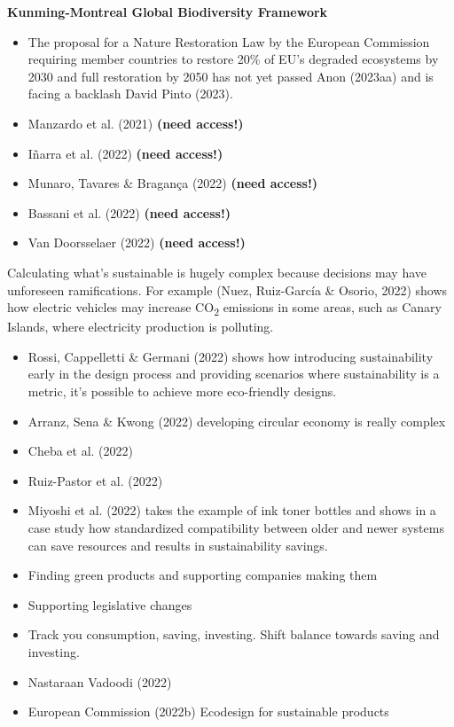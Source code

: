 \documentclass[
  letterpaper,
  DIV=11,
  numbers=noendperiod]{scrartcl}
\begin{document}
\textbf{Kunming-Montreal Global Biodiversity Framework}

\begin{itemize}
\item
  The proposal for a Nature Restoration Law by the European Commission
  requiring member countries to restore 20\% of EU's degraded ecosystems
  by 2030 and full restoration by 2050 has not yet passed Anon (2023aa)
  and is facing a backlash David Pinto (2023).
\item
  Manzardo et al. (2021) \textbf{(need access!)}
\item
  Iñarra et al. (2022) \textbf{(need access!)}
\item
  Munaro, Tavares \& Bragança (2022) \textbf{(need access!)}
\item
  Bassani et al. (2022) \textbf{(need access!)}
\item
  Van Doorsselaer (2022) \textbf{(need access!)}
\end{itemize}

Calculating what's sustainable is hugely complex because decisions may
have unforeseen ramifications. For example (Nuez, Ruiz-García \& Osorio,
2022) shows how electric vehicles may increase CO\textsubscript{2}
emissions in some areas, such as Canary Islands, where electricity
production is polluting.

\begin{itemize}
\item
  Rossi, Cappelletti \& Germani (2022) shows how introducing
  sustainability early in the design process and providing scenarios
  where sustainability is a metric, it's possible to achieve more
  eco-friendly designs.
\item
  Arranz, Sena \& Kwong (2022) developing circular economy is really
  complex
\item
  Cheba et al. (2022)
\item
  Ruiz-Pastor et al. (2022)
\item
  Miyoshi et al. (2022) takes the example of ink toner bottles and shows
  in a case study how standardized compatibility between older and newer
  systems can save resources and results in sustainability savings.
\item
  Finding green products and supporting companies making them
\item
  Supporting legislative changes
\item
  Track you consumption, saving, investing. Shift balance towards saving
  and investing.
\item
  Nastaraan Vadoodi (2022)
\item
  European Commission (2022b) Ecodesign for sustainable products
\end{itemize}
\end{document}
